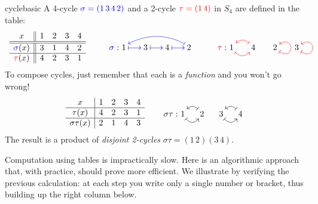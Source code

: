 \begin{example}{}{cyclebasic}
	A 4-cycle $\textcolor{blue}{\sigma=(1\,3\,4\,2)}$ and a 2-cycle $\textcolor{red}{\tau=(1\,4)}$ in $S_4$ are defined in the table:
	\[
		\begin{array}[t]{c||cccc}
			x&1&2&3&4\\\hline\hline
			\textcolor{blue}{\sigma}(x)&3&1&4&2\\\hline
			\textcolor{red}{\tau}(x)&4&2&3&1
		\end{array}
		\qquad\qquad
		\SelectTips{cm}{}
		\xymatrix @C15pt @R5pt{%
			&&&\\
		 	\makebox[0pt][r]{$\textcolor{blue}{\sigma}:\ $}1 \ar@{|->}@[blue][r] & 3 \ar@{|->}@[blue][r] & 4 \ar@{|->}@[blue][r] & 2 \ar@/_1.0pc/@<-2pt>@{|->}@[blue][lll]
		}
		\qquad\qquad
		\SelectTips{cm}{}
		\xymatrix @C15pt @R5pt{%
			&&&\\
		 	\makebox[0pt][r]{$\textcolor{red}{\tau}:$\ }1 \ar@/_0.8pc/@{|->}@[red][r]& 4 \ar@/_0.8pc/@{|->}@[red][l] & 2 \ar@{|->}@(dr,ur)@[red] & 3 \ar@{|->}@(dr,ur)@[red]
		}
	\]
	To compose cycles, just remember that each is a \emph{function} and you won't go wrong!
	\[
		\begin{array}[t]{c|cccc}
			x&1&2&3&4\\\hline
			\tau(x)&4&2&3&1\\\hline
			\sigma\tau(x)&2&1&4&3
		\end{array}
		\qquad\qquad
		\SelectTips{cm}{}
		\xymatrix @C12pt @R5pt{%
			&&&\\
	 		\makebox[0pt][r]{$\sigma\tau:$\ }1 \ar@/_0.8pc/@{|->}[r] & 2 \ar@/_0.8pc/@{|->}[l] & 3 \ar@/_0.8pc/@{|->}[r] & 4 \ar@/_0.8pc/@{|->}[l]
		}
	\]
	The result is a product of \emph{disjoint 2-cycles} $\sigma\tau=(1\,2)(3\,4)$.
\end{example}



\label{pg:cyclenot}

Computation using tables is impractically slow. Here is an algorithmic approach that, with practice, should prove more efficient. We illustrate by verifying the previous calculation: at each step you write only a single number or bracket, thus building up the right column below.


